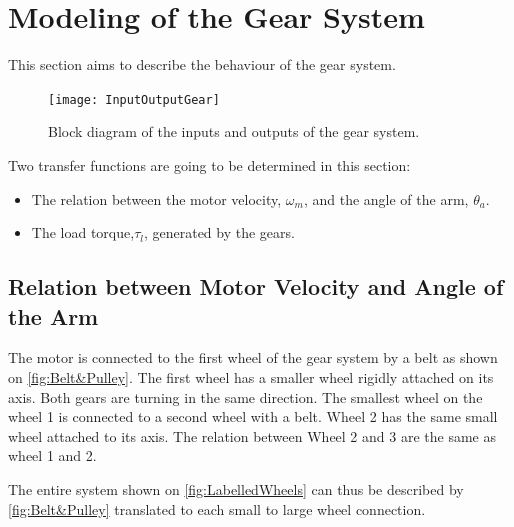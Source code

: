 \newpage
\graphicspath{{figures/modeling/gearTrain/}}
\section{Modeling of the Gear System}\label{sec:ModGearSys}
This section aims to describe the behaviour of the gear system. 

\begin{figure}[htbp]
	\centering
	\texttt{[image: InputOutputGear]}
	\caption{Block diagram of the inputs and outputs of the gear system.}
	\label{fig:GearSystemDiagram}
\end{figure}
\linebreak
\startexplain
{}
\stopexplain

Two transfer functions are going to be determined in this section: 
\begin{itemize}[noitemsep]
\item The relation between the motor velocity, $\omega_m$, and the angle of the arm, $\theta_a$.
\item The load torque,$\tau_l$, generated by the gears.
\end{itemize}

\subsection{Relation between Motor Velocity and Angle of the Arm}
The motor is connected to the first wheel of the gear system by a belt as shown on \autoref{fig:Belt&Pulley}. The first wheel has a smaller wheel rigidly attached on its axis. Both gears are turning in the same direction. The smallest wheel on the wheel 1 is connected to a second wheel with a belt. Wheel 2 has the same small wheel attached to its axis. The relation between Wheel 2 and 3 are the same as wheel 1 and 2.

The entire system shown on \autoref{fig:LabelledWheels} can thus be described by \autoref{fig:Belt&Pulley} translated to each small to large wheel connection.

